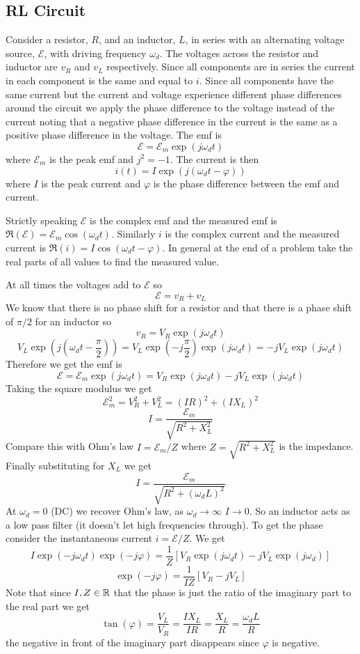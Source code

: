 \documentclass{article}
\newcommand{\emf}{\mathcal{E}}
\begin{document}
    \subsection{RL Circuit}
    Consider a resistor, \(R\), and an inductor, \(L\), in series with an alternating voltage source, \(\emf\), with driving frequency \(\omega_d\).
    The voltages across the resistor and inductor are \(v_R\) and \(v_L\) respectively.
    Since all components are in series the current in each component is the same and equal to \(i\).
    Since all components have the same current but the current and voltage experience different phase differences around the circuit we apply the phase difference to the voltage instead of the current noting that a negative phase difference in the current is the same as a positive phase difference in the voltage.
    The emf is
    \[\emf = \emf_m\exp(j\omega_d t)\]
    where \(\emf_m\) is the peak emf and \(j^2 = -1\).
    The current is then
    \[i(t) = I\exp(j(\omega_d t - \varphi))\]
    where \(I\) is the peak current and \(\varphi\) is the phase difference between the emf and current.
    
    Strictly speaking \(\emf\) is the complex emf and the measured emf is \(\Re(\emf) = \emf_m\cos(\omega_d t)\).
    Similarly \(i\) is the complex current and the measured current is \(\Re(i) = I\cos(\omega_d t - \varphi)\).
    In general at the end of a problem take the real parts of all values to find the measured value.
    
    At all times the voltages add to \(\emf\) so
    \[\emf = v_R + v_L\]
    We know that there is no phase shift for a resistor and that there is a phase shift of \(\pi/2\) for an inductor so
    \[v_R = V_R\exp(j\omega_d t)\]
    \[V_L\exp\left(j\left(\omega_d t - \frac{\pi}{2}\right)\right) = V_L\exp\left(-j\frac{\pi}{2}\right)\exp(j\omega_d t) = -jV_L\exp(j\omega_d t)\]
    Therefore we get the emf is
    \[\emf = \emf_m\exp(j\omega_d t) = V_R\exp(j\omega_d t) - jV_L\exp(j\omega_d t)\]
    Taking the square modulus we get
    \[\emf_m^2 = V_R^2 + V_L^2 = (IR)^2 + (IX_L)^2\]
    \[I = \frac{\emf_m}{\sqrt{R^2 + X_L^2}}\]
    Compare this with Ohm's law \(I = \emf_m/Z\) where \(Z = \sqrt{R^2 + X_L^2}\) is the impedance.
    Finally substituting for \(X_L\) we get
    \[I = \frac{\emf_m}{\sqrt{R^2 + (\omega_d L)^2}}\]
    At \(\omega_d = 0\) (DC) we recover Ohm's law, as \(\omega_d\to\infty\) \(I\to 0\).
    So an inductor acts as a low pass filter (it doesn't let high frequencies through).
    To get the phase consider the instantaneous current \(i = \emf/Z\).
    We get
    \[I\exp(-j\omega_d t)\exp(-j\varphi) = \frac{1}{Z}[V_R\exp(j\omega_d t) - jV_L\exp(j\omega_d)]\]
    \[\exp(-j\varphi) = \frac{1}{IZ}[V_R - jV_L]\]
    Note that since \(I, Z\in\mathbb{R}\) that the phase is just the ratio of the imaginary part to the real part we get
    \[\tan(\varphi) = \frac{V_L}{V_R} = \frac{IX_L}{IR} = \frac{X_L}{R} = \frac{\omega_d L}{R}\]
    the negative in front of the imaginary part disappears since \(\varphi\) is negative.
    
\end{document}

